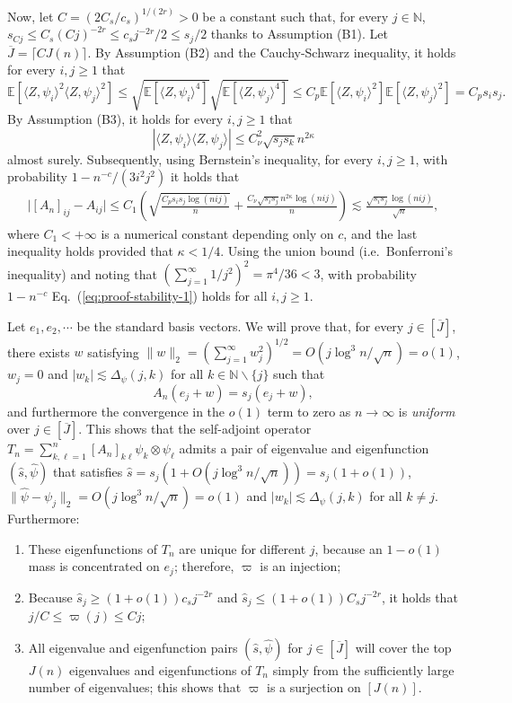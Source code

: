 \documentclass[11pt,a4paper]{article}
\renewcommand{\hat}{\widehat}
\renewcommand{\bar}{\overline}
\theoremstyle{definition}
\theoremstyle{plain}
\theoremstyle{remark}
\begin{document}
Now, let $C=(2C_s/c_s)^{1/(2r)}>0$ be a constant such that, for every $j\in\mathbb N$, $s_{Cj}\leq C_s (Cj)^{-2r} \leq c_sj^{-2r}/2\leq s_j/2$ thanks to Assumption (B1). 
Let $\bar J=\lceil CJ(n)\rceil$.
By Assumption (B2) and the Cauchy-Schwarz inequality, it holds for every $i,j\geq 1$ that 
$$
\mathbb E[\langle Z,\psi_i\rangle^2\langle Z,\psi_j\rangle^2] \leq \sqrt{\mathbb E[\langle Z,\psi_i\rangle^4]}\sqrt{\mathbb E[\langle Z,\psi_j\rangle^4]}
\leq C_p\mathbb E[\langle Z,\psi_i\rangle^2]\mathbb E[\langle Z,\psi_j\rangle^2] = C_ps_is_j.
$$
By Assumption (B3), it holds for every $i,j\geq 1$ that 
$$
|\langle Z,\psi_i\rangle\langle Z,\psi_j\rangle| \leq C_\nu^2\sqrt{s_js_k}n^{2\kappa}
$$ almost surely.
Subsequently, using Bernstein's inequality, for every $i,j\geq 1$, with probability $1-n^{-c}/(3i^2j^2)$ it holds that 
\begin{align}
\big|[A_n]_{ij}-A_{ij}\big| \leq C_1\left(\sqrt{\frac{C_ps_is_j\log (nij)}{n}} + \frac{C_\nu\sqrt{s_is_j}n^{2\kappa}\log (nij)}{n}\right) \lesssim \frac{\sqrt{s_is_j}\log(nij)}{\sqrt{n}},
\label{eq:proof-stability-1}
\end{align}
where $C_1<+\infty$ is a numerical constant depending only on $c$, and the last inequality holds provided that $\kappa<1/4$.
Using the union bound (i.e.~Bonferroni's inequality) and noting that $(\sum_{j=1}^{\infty}1/j^2)^2=\pi^4/36<3$, with probability $1-n^{-c}$ Eq.~(\ref{eq:proof-stability-1}) holds for all $i,j\geq 1$.

Let $e_1,e_2,\cdots$ be the standard basis vectors.
We will prove that, for every $j\in[\bar J]$, there exists $w$ satisfying $\|w\|_2 =(\sum_{j=1}^{\infty}w_j^2)^{1/2}= O(j\log^3 n/\sqrt{n})=o(1)$, $w_j=0$ and $|w_k|\lesssim \Delta_\psi(j,k)$ for all $k\in\mathbb N\backslash\{j\}$ such that
\begin{equation}
A_n (e_j+w) = s_j(e_j+w),
\label{eq:eigen-an}
\end{equation}
and furthermore the convergence in the $o(1)$ term to zero as $n\to\infty$ is \emph{uniform} over $j\in[\bar J]$.
This shows that the self-adjoint operator $T_n=\sum_{k,\ell=1}^{n}[A_n]_{k\ell}\psi_k\otimes\psi_\ell$ admits a pair of eigenvalue and eigenfunction $(\hat s,\hat\psi)$ that satisfies
$\hat s=s_j(1+O(j\log^3 n/\sqrt{n}))=s_j(1+o(1))$, $\|\hat\psi-\psi_j\|_2=O(j\log^3 n/\sqrt{n})=o(1)$ and $|w_k|\lesssim \Delta_\psi(j,k)$ for all $k\neq j$. 
Furthermore:
\begin{enumerate}
\item These eigenfunctions of $T_n$ are unique for different $j$, because an $1-o(1)$ mass is concentrated on $e_j$; therefore, $\varpi$ is an injection;
\item Because $\hat s_j \geq (1+o(1))c_s j^{-2r}$ and $\hat s_j\leq (1+o(1))C_s j^{-2r}$, it holds that $j/C\leq \varpi(j)\leq Cj$;
\item All eigenvalue and eigenfunction pairs $(\hat s,\hat\psi)$ for $j\in[\bar J]$ will cover the top $J(n)$ eigenvalues and eigenfunctions of $T_n$ simply from the sufficiently large number of eigenvalues;
this shows that $\varpi$ is a surjection on $[J(n)]$.
\end{enumerate}
\end{document}
